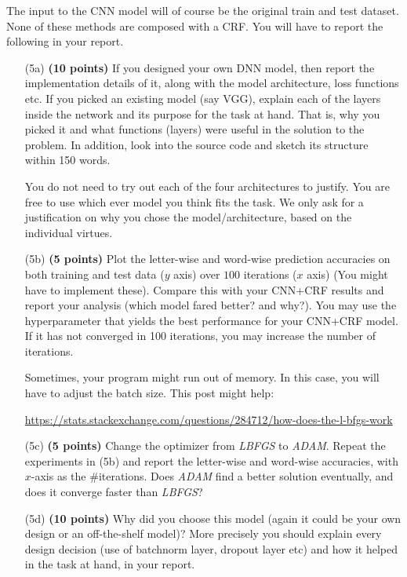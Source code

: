 \documentclass[11pt]{report}
\begin{document}
The input to the CNN model will of course be the original train and test
dataset. None of these methods are composed with a CRF.
You will have to report the following in your report.
%
\begin{itemize}
\item[(5a)] \textbf{(10 points)} If you designed your own DNN model, then report
  the implementation details of it, along with the model architecture, loss
  functions etc. If you picked an existing model (say VGG), explain each of the
  layers inside the network and its purpose for the task at hand. That is, why
  you picked it and what functions (layers) were useful in the solution to the
  problem. In addition, look into the source code and sketch its structure
  within 150 words.

	You do not need to try out each of the four architectures to justify.
	You are free to use which ever model you think fits the task. We only ask for a justification on why you chose the model/architecture, based on the individual virtues. 
	
\item[(5b)] \textbf{(5 points)} Plot the letter-wise and word-wise prediction
  accuracies on both training and test data (\(y\) axis) over \(100\) iterations
  (\(x\) axis) (You might have to implement these). Compare this with your CNN+CRF
  results and report your analysis (which model fared better? and why?). You may
  use the hyperparameter that yields the best performance for your CNN+CRF
  model.
  If it has not converged in 100 iterations, you may increase the number of iterations.
  
  Sometimes, your program might run out of memory. In this case, you will have to adjust the batch size.  This post might help:
  
  \url{https://stats.stackexchange.com/questions/284712/how-does-the-l-bfgs-work}
  
  
  
\item[(5c)] {\bf (5 points)} Change the optimizer from {\em LBFGS} to {\em
    ADAM}. Repeat the experiments in (5b) and report the letter-wise and
  word-wise accuracies, with \(x\)-axis as the \#iterations. Does {\em ADAM} find
  a better solution eventually, and does it converge faster than {\em LBFGS}?


\item[(5d)] \textbf{(10 points)} Why did you choose this model (again it could
  be your own design or an off-the-shelf model)? More precisely you should
  explain every design decision (use of batchnorm layer, dropout layer etc) and
  how it helped in the task at hand, in your report.
\end{itemize}
\end{document}
